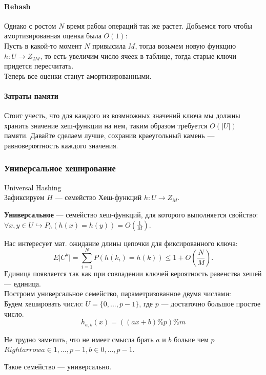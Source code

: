 \paragraph{Rehash}
Однако с ростом $N$ время рабоы операций так же растет. Добьемся того чтобы амортизированная оценка была  $O(1)$: \\
Пусть в какой-то момент  $N$ привысила  $M$, тогда возьмем новую функцию  $h: U \to Z_{2M}$, то есть увеличим число ячеек в таблице, 
тогда старые ключи придется пересчитать. \\ 
Теперь все оценки станут амортизированными. \\

\paragraph{Затраты памяти}
Стоит учесть, что для каждого из возмножных значений ключа мы должны хранить значение хеш-функции на нем,
таким образом требуется $O(\lvert U \rvert)$ памяти. Давайте сделаем лучше, сохранив краеугольный камень --- равновероятность каждого значения. 

\subsubsection{Универсальное хеширование}
Universal Hashing \\

Зафиксируем $H$ --- семейство Хеш-функций  $h: U \to Z_M$. \\
 \begin{Def}
     \textbf{Универсальное} --- семейство хеш-функций, для которого выполняется свойство: 
      $\forall x, y \in U \hookrightarrow P_h(h(x) = h(y)) = O(\frac{1}{M})$.
\end{Def}

Нас интересует мат. ожидание длины цепочки для фиксированного ключа:
\[
    E\lvert C^k \rvert = \sum \limits _{i = 1}^{N} P(h(k_i) = h(k)) \leq 1 + O(\frac{N}{M})
.\] 
Единица появляется так как при совпадении ключей вероятность равенства хешей --- единица. \\

Построим универсальное семейство, параметризованное двумя числами: \\
Будем хешировать число: $U = \{0, ..., p - 1\}$, где  $p$ --- достаточно большое простое число. \\
\[
    h_{a, b}(x) = ((ax + b) \% p) \% m
\]

Не трудно заметить, что не имеет смысла брать $a$ и  $b$ больие чем  $p$  $Rightarrow a \in {1, ..., p - 1}, b \in {0, ..., p - 1}$. \\
\begin{prop}
   Такое семейство --- универсально.
\end{prop}

